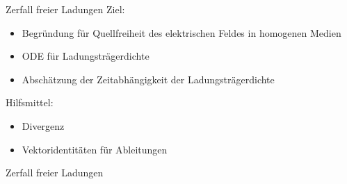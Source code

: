 \documentclass[fleqn,aspectratio=169]{beamer}
\begin{document}
\begin{frame}{Zerfall freier Ladungen}
Ziel:
\begin{itemize}
    \item Begründung für Quellfreiheit des elektrischen Feldes in homogenen Medien
    \item ODE für Ladungsträgerdichte
    \item Abschätzung der Zeitabhängigkeit der Ladungsträgerdichte
\end{itemize}
Hilfsmittel:
    \begin{itemize}
        \item Divergenz
        \item Vektoridentitäten für Ableitungen
    \end{itemize}

\end{frame}

\begin{frame}{Zerfall freier Ladungen}
    \begin{columns}[c]
        \begin{column}{0.5\textwidth}
        \end{column}
        \quad
        \begin{column}{0.44\textwidth}
        \end{column}
    \end{columns}
\end{frame}
\end{document}
